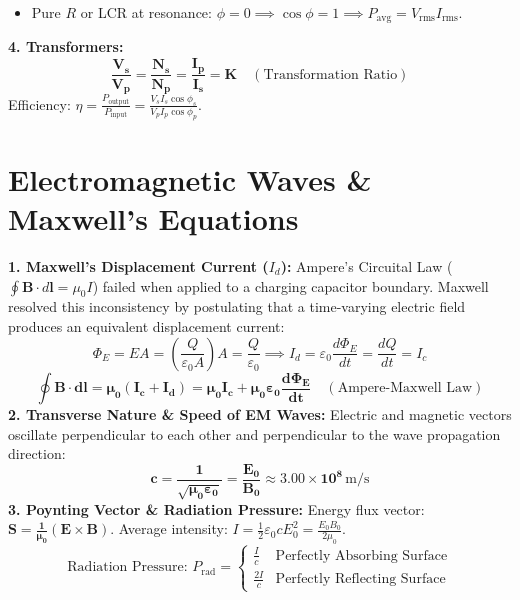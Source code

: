\documentclass[10pt,twoside,openright]{book}
\begin{document}
\begin{formulabox}
\begin{itemize}
  \item Pure $R$ or LCR at resonance: $\phi = 0 \implies \cos\phi = 1 \implies P_{\text{avg}} = V_{\text{rms}} I_{\text{rms}}$.
\end{itemize}
\textbf{4. Transformers:}
\begin{equation}
  \mathbf{\frac{V_s}{V_p} = \frac{N_s}{N_p} = \frac{I_p}{I_s} = K} \quad (\text{Transformation Ratio})
\end{equation}
Efficiency: $\eta = \frac{P_{\text{output}}}{P_{\text{input}}} = \frac{V_s I_s \cos\phi_s}{V_p I_p \cos\phi_p}$.
\end{formulabox}

\section{Electromagnetic Waves \& Maxwell's Equations}

\begin{conceptbox}
\textbf{1. Maxwell's Displacement Current ($I_d$):}
Ampere's Circuital Law ($\oint \mathbf{B}\cdot d\mathbf{l} = \mu_0 I$) failed when applied to a charging capacitor boundary. Maxwell resolved this inconsistency by postulating that a time-varying electric field produces an equivalent displacement current:
\begin{equation}
  \Phi_E = E A = \left(\frac{Q}{\varepsilon_0 A}\right) A = \frac{Q}{\varepsilon_0} \implies I_d = \varepsilon_0 \frac{d\Phi_E}{dt} = \frac{dQ}{dt} = I_c
\end{equation}
\begin{equation}
  \mathbf{\oint \mathbf{B}\cdot d\mathbf{l} = \mu_0 (I_c + I_d) = \mu_0 I_c + \mu_0 \varepsilon_0 \frac{d\Phi_E}{dt}} \quad (\text{Ampere-Maxwell Law})
\end{equation}
\textbf{2. Transverse Nature \& Speed of EM Waves:}
Electric and magnetic vectors oscillate perpendicular to each other and perpendicular to the wave propagation direction:
\begin{equation}
  \mathbf{c = \frac{1}{\sqrt{\mu_0 \varepsilon_0}} = \frac{E_0}{B_0} \approx 3.00 \times 10^8\,\mathrm{m/s}}
\end{equation}
\textbf{3. Poynting Vector \& Radiation Pressure:}
Energy flux vector: $\mathbf{S = \frac{1}{\mu_0}(\mathbf{E} \times \mathbf{B})}$. Average intensity: $I = \frac{1}{2}\varepsilon_0 c E_0^2 = \frac{E_0 B_0}{2\mu_0}$.
\begin{equation}
  \text{Radiation Pressure: } P_{\text{rad}} = \begin{cases} \frac{I}{c} & \text{Perfectly Absorbing Surface} \\ \frac{2I}{c} & \text{Perfectly Reflecting Surface} \end{cases}
\end{equation}
\end{conceptbox}
\end{document}
